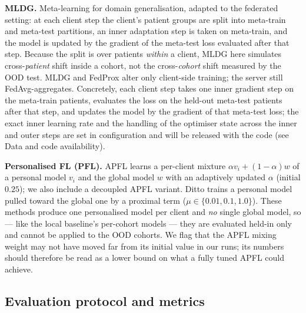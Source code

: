 \documentclass[10pt,letterpaper]{article}
\begin{document}
\textbf{MLDG.} Meta-learning for domain generalisation, adapted to the federated
setting: at each client step the client's patient groups are split into
meta-train and meta-test partitions, an inner adaptation step is taken on
meta-train, and the model is updated by the gradient of the meta-test loss
evaluated after that step. Because the split is over patients \emph{within} a
client, MLDG here simulates cross-\emph{patient} shift inside a cohort, not the
cross-\emph{cohort} shift measured by the OOD test. MLDG and FedProx alter only
client-side training; the server still FedAvg-aggregates. Concretely, each client
step takes one inner gradient step on the meta-train patients, evaluates the loss
on the held-out meta-test patients after that step, and updates the model by the
gradient of that meta-test loss; the exact inner learning rate and the handling
of the optimiser state across the inner and outer steps are set in configuration
and will be released with the code (see Data and code availability).

\textbf{Personalised FL (PFL).} APFL learns a per-client mixture
$\alpha v_i + (1-\alpha)w$ of a personal model $v_i$ and the global model $w$
with an adaptively updated $\alpha$ (initial $0.25$); we also include a decoupled
APFL variant. Ditto trains a personal model pulled toward the global one by a
proximal term ($\mu\in\{0.01,0.1,1.0\}$). These methods produce one personalised
model per client and \emph{no} single global model, so --- like the local
baseline's per-cohort models --- they are evaluated held-in only and cannot be
applied to the OOD cohorts. We flag that the APFL mixing weight may not have moved
far from its initial value in our runs; its numbers should therefore be read as a
lower bound on what a fully tuned APFL could achieve.

\subsection*{Evaluation protocol and metrics}
\end{document}
